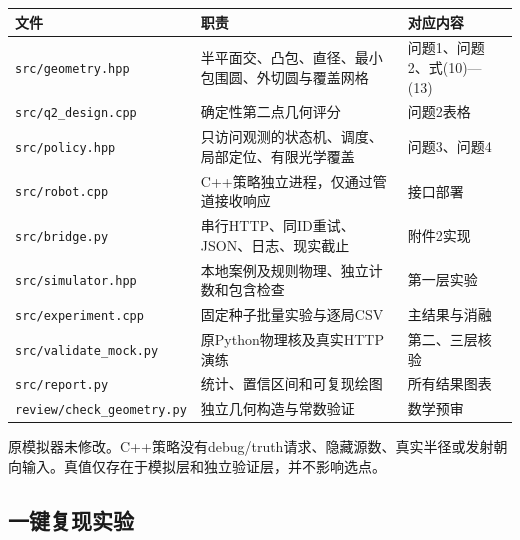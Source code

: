 \documentclass[
  chinese,
  UTF8,
  a4paper,
  zihao=-4]{ctexart}
\begin{document}
\begin{longtable}[]{@{}
  >{\raggedright\arraybackslash}p{}
  >{\raggedright\arraybackslash}p{}
  >{\raggedright\arraybackslash}p{}@{}}
\toprule\noalign{}
\begin{minipage}[b]{\linewidth}\raggedright
文件
\end{minipage} & \begin{minipage}[b]{\linewidth}\raggedright
职责
\end{minipage} & \begin{minipage}[b]{\linewidth}\raggedright
对应内容
\end{minipage} \\
\midrule\noalign{}
\endhead
\bottomrule\noalign{}
\endlastfoot
\texttt{src/geometry.hpp} &
半平面交、凸包、直径、最小包围圆、外切圆与覆盖网格 &
问题1、问题2、式(10)---(13) \\
\texttt{src/q2\_design.cpp} & 确定性第二点几何评分 & 问题2表格 \\
\texttt{src/policy.hpp} &
只访问观测的状态机、调度、局部定位、有限光学覆盖 & 问题3、问题4 \\
\texttt{src/robot.cpp} & C++策略独立进程，仅通过管道接收响应 &
接口部署 \\
\texttt{src/bridge.py} & 串行HTTP、同ID重试、JSON、日志、现实截止 &
附件2实现 \\
\texttt{src/simulator.hpp} & 本地案例及规则物理、独立计数和包含检查 &
第一层实验 \\
\texttt{src/experiment.cpp} & 固定种子批量实验与逐局CSV &
主结果与消融 \\
\texttt{src/validate\_mock.py} & 原Python物理核及真实HTTP演练 &
第二、三层核验 \\
\texttt{src/report.py} & 统计、置信区间和可复现绘图 & 所有结果图表 \\
\texttt{review/check\_geometry.py} & 独立几何构造与常数验证 &
数学预审 \\
\end{longtable}

原模拟器未修改。C++策略没有debug/truth请求、隐藏源数、真实半径或发射朝向输入。真值仅存在于模拟层和独立验证层，并不影响选点。

\subsection{一键复现实验}\label{ux4e00ux952eux590dux73b0ux5b9eux9a8c}
\end{document}
